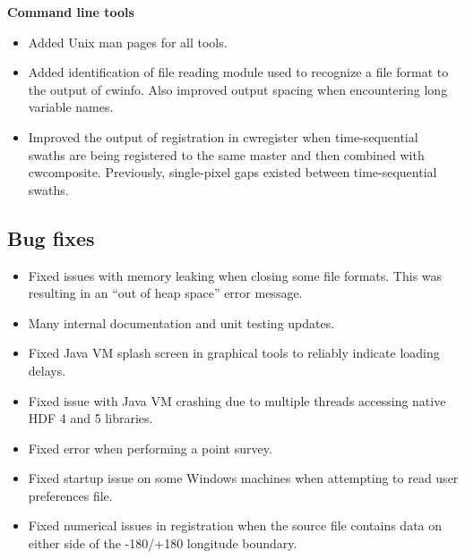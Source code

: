 \hspace{0.4cm} {\bf Command line tools}

\begin{itemize}

  \item Added Unix man pages for all tools.

  \item Added identification of file reading module used to recognize a file
  format to the output of cwinfo.  Also improved output spacing when
  encountering long variable names.

  \item Improved the output of registration in cwregister when time-sequential
  swaths are being registered to the same master and then combined with
  cwcomposite.  Previously, single-pixel gaps existed between time-sequential
  swaths.

\end{itemize}

\subsection*{ Bug fixes}
\begin{itemize}

  \item Fixed issues with memory leaking when closing some file formats.  This
  was resulting in an ``out of heap space'' error message.

  \item Many internal documentation and unit testing updates.

  \item Fixed Java VM splash screen in graphical tools to reliably indicate
  loading delays.

  \item Fixed issue with Java VM crashing due to multiple threads accessing
  native HDF 4 and 5 libraries.

  \item Fixed error when performing a point survey.

  \item Fixed startup issue on some Windows machines when attempting to
  read user preferences file.

  \item Fixed numerical issues in registration when the source file contains
  data on either side of the -180/+180 longitude boundary.

\end{itemize}

